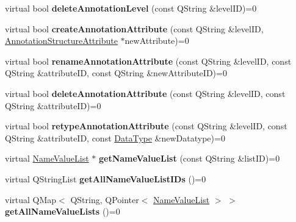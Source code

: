 \begin{DoxyCompactItemize}
\item 
\mbox{\label{class_annotation_datastore_a0fc45673ff4f7e4c0604cf579ab00ea9}} 
virtual bool {\bfseries delete\+Annotation\+Level} (const Q\+String \&level\+ID)=0
\item 
\mbox{\label{class_annotation_datastore_aa0c8d67d5fa7f6389ec49431a5007082}} 
virtual bool {\bfseries create\+Annotation\+Attribute} (const Q\+String \&level\+ID, \hyperlink{class_annotation_structure_attribute}{Annotation\+Structure\+Attribute} $\ast$new\+Attribute)=0
\item 
\mbox{\label{class_annotation_datastore_ac9acf89fc8a6bbe69a92065c0511aceb}} 
virtual bool {\bfseries rename\+Annotation\+Attribute} (const Q\+String \&level\+ID, const Q\+String \&attribute\+ID, const Q\+String \&new\+Attribute\+ID)=0
\item 
\mbox{\label{class_annotation_datastore_af69e5a5769239562d26ceb65b861dbbd}} 
virtual bool {\bfseries delete\+Annotation\+Attribute} (const Q\+String \&level\+ID, const Q\+String \&attribute\+ID)=0
\item 
\mbox{\label{class_annotation_datastore_a3fc607b737437f56ab99fbdc5f93eea3}} 
virtual bool {\bfseries retype\+Annotation\+Attribute} (const Q\+String \&level\+ID, const Q\+String \&attribute\+ID, const \hyperlink{class_data_type}{Data\+Type} \&new\+Datatype)=0
\item 
\mbox{\label{class_annotation_datastore_abec36f7893416d7bd948a49ebea82ddd}} 
virtual \hyperlink{class_name_value_list}{Name\+Value\+List} $\ast$ {\bfseries get\+Name\+Value\+List} (const Q\+String \&list\+ID)=0
\item 
\mbox{\label{class_annotation_datastore_acd6544544bf73139e5167259bb7cf9fa}} 
virtual Q\+String\+List {\bfseries get\+All\+Name\+Value\+List\+I\+Ds} ()=0
\item 
\mbox{\label{class_annotation_datastore_aa420f9a710d03b74219f370bc76bafd6}} 
virtual Q\+Map$<$ Q\+String, Q\+Pointer$<$ \hyperlink{class_name_value_list}{Name\+Value\+List} $>$ $>$ {\bfseries get\+All\+Name\+Value\+Lists} ()=0

\end{DoxyCompactItemize}

